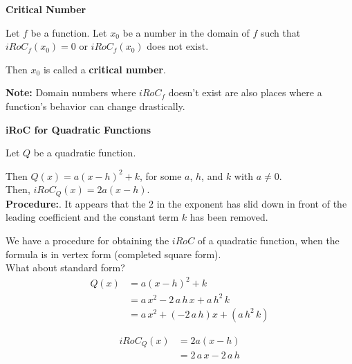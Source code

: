 \documentclass{ximera}
\begin{document}
\begin{definition} \textbf{\textcolor{green!50!black}{Critical Number}}  


Let $f$ be a function. Let $x_0$ be a number in the domain of $f$ such that $iRoC_f(x_0) = 0$ or $iRoC_f(x_0)$ does not exist.

Then $x_0$ is called a \textbf{critical number}.


\end{definition}
\textbf{Note: } Domain numbers where $iRoC_f$ doesn't exist are also places where a function's behavior can change drastically.



\begin{procedure} \textbf{\textcolor{blue!75!black}{iRoC for Quadratic Functions}} 



Let $Q$ be a quadratic function.

Then $Q(x) = a (x - h)^2 + k$, for some $a$, $h$, and $k$ with $a \ne 0$. \\

Then, $iRoC_Q(x) = 2 a (x - h)$. \\


\textbf{Procedure:}. It appears that the $2$ in the exponent has slid down in front of the leading coefficient and the constant term $k$ has been removed.



\end{procedure}



We have a procedure for obtaining the $iRoC$ of a quadratic function, when the formula is in vertex form (completed square form). \\

What about standard form? \\



\begin{align*}
Q(x) & = a (x - h)^2 + k \\
     & = a \, x^2 - 2 \, a \, h \, x + a \, h^2 \, k \\
     & = a \, x^2  + (- 2 \, a \, h) x + (a \, h^2 \, k) 
\end{align*}


\begin{align*}
iRoC_Q(x) &= 2 a (x - h) \\
          & = 2 \, a \, x - 2 \, a \, h  \\
\end{align*}
\end{document}
